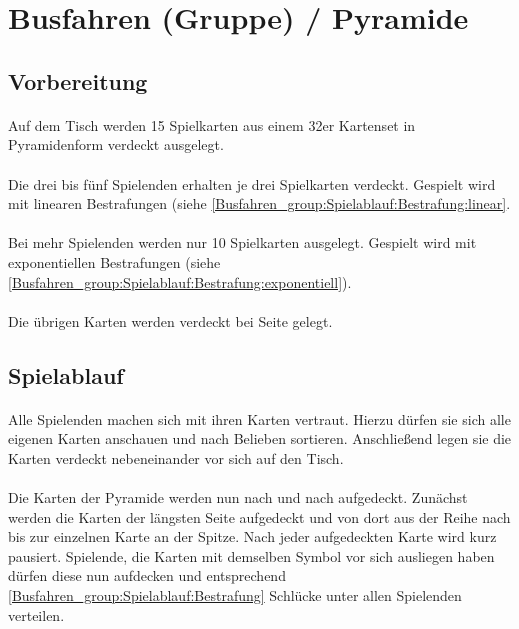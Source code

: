 \section{Busfahren (Gruppe) / Pyramide}
\subsection{Vorbereitung}
\paragraph{}
Auf dem Tisch werden 15 Spielkarten aus einem 32er Kartenset in Pyramidenform verdeckt ausgelegt.


\paragraph{}
Die drei bis fünf Spielenden erhalten je drei Spielkarten verdeckt. Gespielt wird mit linearen Bestrafungen (siehe \ref{Busfahren_group:Spielablauf:Bestrafung:linear}.

\paragraph{}
Bei mehr Spielenden werden nur 10 Spielkarten ausgelegt. Gespielt wird mit exponentiellen Bestrafungen (siehe \ref{Busfahren_group:Spielablauf:Bestrafung:exponentiell}).

\paragraph{}
Die übrigen Karten werden verdeckt bei Seite gelegt.


\subsection{Spielablauf}
\paragraph{}
Alle Spielenden machen sich mit ihren Karten vertraut.
Hierzu dürfen sie sich alle eigenen Karten anschauen und nach Belieben sortieren.
Anschließend legen sie die Karten verdeckt nebeneinander vor sich auf den Tisch. 

\paragraph{}
Die Karten der Pyramide werden nun nach und nach aufgedeckt.
Zunächst werden die Karten der längsten Seite aufgedeckt und von dort aus der Reihe nach bis zur einzelnen Karte an der Spitze.
Nach jeder aufgedeckten Karte wird kurz pausiert.
Spielende, die Karten mit demselben Symbol vor sich ausliegen haben dürfen diese nun aufdecken und entsprechend \ref{Busfahren_group:Spielablauf:Bestrafung} Schlücke unter allen Spielenden verteilen.

